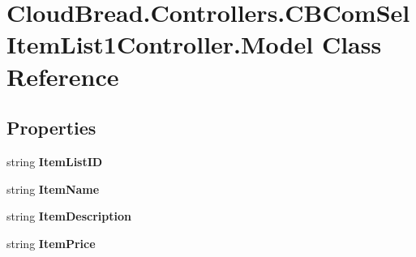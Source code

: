\hypertarget{class_cloud_bread_1_1_controllers_1_1_c_b_com_sel_item_list1_controller_1_1_model}{}\section{Cloud\+Bread.\+Controllers.\+C\+B\+Com\+Sel\+Item\+List1\+Controller.\+Model Class Reference}
\label{class_cloud_bread_1_1_controllers_1_1_c_b_com_sel_item_list1_controller_1_1_model}
\subsection*{Properties}
\begin{DoxyCompactItemize}
\item 
string {\bfseries Item\+List\+ID}\hypertarget{class_cloud_bread_1_1_controllers_1_1_c_b_com_sel_item_list1_controller_1_1_model_a8261b558b5fd2adc27fcc3113247d7c3}{}\label{class_cloud_bread_1_1_controllers_1_1_c_b_com_sel_item_list1_controller_1_1_model_a8261b558b5fd2adc27fcc3113247d7c3}

\item 
string {\bfseries Item\+Name}\hypertarget{class_cloud_bread_1_1_controllers_1_1_c_b_com_sel_item_list1_controller_1_1_model_af6d172fb00e7a1ea505ec6c5e14408ca}{}\label{class_cloud_bread_1_1_controllers_1_1_c_b_com_sel_item_list1_controller_1_1_model_af6d172fb00e7a1ea505ec6c5e14408ca}

\item 
string {\bfseries Item\+Description}\hypertarget{class_cloud_bread_1_1_controllers_1_1_c_b_com_sel_item_list1_controller_1_1_model_ae5786e2691d43829644fcba7d9d99038}{}\label{class_cloud_bread_1_1_controllers_1_1_c_b_com_sel_item_list1_controller_1_1_model_ae5786e2691d43829644fcba7d9d99038}

\item 
string {\bfseries Item\+Price}\hypertarget{class_cloud_bread_1_1_controllers_1_1_c_b_com_sel_item_list1_controller_1_1_model_aeacba16b5783de26a3fcd8ae3af857a7}{}\label{class_cloud_bread_1_1_controllers_1_1_c_b_com_sel_item_list1_controller_1_1_model_aeacba16b5783de26a3fcd8ae3af857a7}


\end{DoxyCompactItemize}
